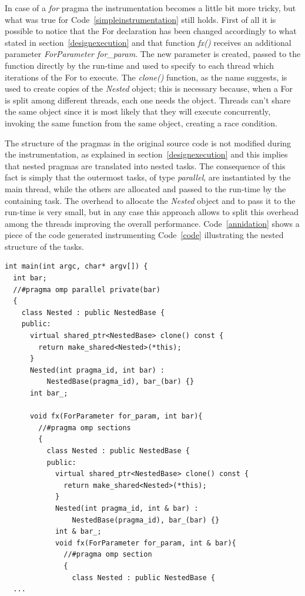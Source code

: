 \documentclass[a4paper,12pt,oneside]{book}
\begin{document}
In case of a \emph{for} pragma the instrumentation becomes a little bit more tricky, but what was true for Code~\ref{simpleinstrumentation} still holds. First of all it is possible to notice that the For declaration has been changed accordingly to what stated in section~\ref{designexecution} and that function \emph{fx()} receives an additional parameter \emph{ForParameter for\_param}. The new parameter is created, passed to the function directly by the run-time and used to specify to each thread which iterations of the For to execute. The \emph{clone()} function, as the name suggests, is used to create copies of the \emph{Nested} object; this is necessary because, when a For is split among different threads, each one needs the object. Threads can’t share the same object since it is most likely that they will execute concurrently, invoking the same function from the same object, creating a race condition. 

The structure of the pragmas in the original source code is not modified during the instrumentation, as explained in section~\ref{designexecution} and this implies that nested pragmas are translated into nested tasks. The consequence of this fact is simply that the outermost tasks, of type \emph{parallel}, are instantiated by the main thread, while the others are allocated and passed to the run-time by the containing task. The overhead to allocate the \emph{Nested} object and to pass it to the run-time is very small, but in any case this approach allows to split this overhead among the threads improving the overall performance. Code~\ref{annidation} shows a piece of the code generated instrumenting Code~\ref{code} illustrating the nested structure of the tasks.

\begin{lstlisting}[language=CCC, caption=Example of tasks annidation from Code~\ref{code}., label=annidation]
int main(int argc, char* argv[]) {
  int bar;
  //#pragma omp parallel private(bar)
  {
    class Nested : public NestedBase {
    public: 
      virtual shared_ptr<NestedBase> clone() const { 
        return make_shared<Nested>(*this); 
      } 
      Nested(int pragma_id, int bar) : 
          NestedBase(pragma_id), bar_(bar) {}
      int bar_;
  
      void fx(ForParameter for_param, int bar){
        //#pragma omp sections
        {
          class Nested : public NestedBase {
          public: 
            virtual shared_ptr<NestedBase> clone() const { 
              return make_shared<Nested>(*this); 
            } 
            Nested(int pragma_id, int & bar) : 
                NestedBase(pragma_id), bar_(bar) {}
            int & bar_;
            void fx(ForParameter for_param, int & bar){
              //#pragma omp section
              {
                class Nested : public NestedBase {
  ...
\end{lstlisting}
\end{document}
